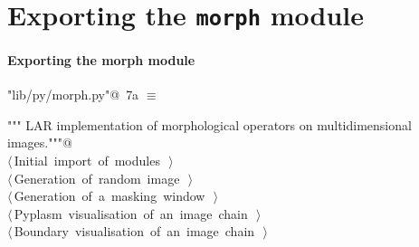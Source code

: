 \documentclass[11pt,oneside]{article}	%
\begin{document}
\section{Exporting the \texttt{morph} module}

\paragraph{Exporting the morph module}
\begin{flushleft} \small
\begin{minipage}{\linewidth} \label{scrap10}
\protect{}\verb@"lib/py/morph.py"@\nobreak\ {\footnotesize 7a }$\equiv$
\vspace{-1ex}
\begin{list}{}{} \item
\mbox{}\verb@""" LAR implementation of morphological operators on multidimensional images."""@\\
\mbox{}\verb@@\hbox{$\langle\,$Initial import of modules\nobreak\ {\footnotesize {}}$\,\rangle$}\verb@@\\
\mbox{}\verb@@\hbox{$\langle\,$Generation of random image\nobreak\ {\footnotesize {}}$\,\rangle$}\verb@@\\
\mbox{}\verb@@\hbox{$\langle\,$Generation of a masking window\nobreak\ {\footnotesize {}}$\,\rangle$}\verb@@\\
\mbox{}\verb@@\hbox{$\langle\,$Pyplasm visualisation of an image chain\nobreak\ {\footnotesize {}}$\,\rangle$}\verb@@\\
\mbox{}\verb@@\hbox{$\langle\,$Boundary visualisation of an image chain\nobreak\ {\footnotesize {}}$\,\rangle$}\verb@@\\
\mbox{}\verb@@{\NWsep}
\end{list}
\vspace{-2ex}
\end{minipage}\\[4ex]
\end{flushleft}
\end{document}
